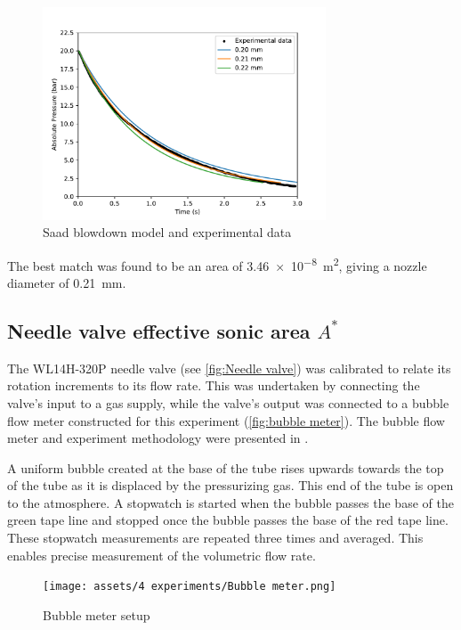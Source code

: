             \begin{figure}[!ht]
                \centering
                \includegraphics[width=0.75\textwidth]{assets/4 experiments/Saad blowdown fit.pdf}
                \caption{Saad blowdown model and experimental data}
                \label{fig:saad blowdown}
            \end{figure}

            The best match was found to be an area of \qty{3.46e-8}{m^2}, giving a nozzle diameter of \qty{0.21}{mm}.

        \subsection{Needle valve effective sonic area $A^*$}

            The WL14H-320P needle valve (see \autoref{fig:Needle valve})  was calibrated to relate its rotation increments to its flow rate. This was undertaken by connecting the valve's input to a gas supply, while the valve's output was connected to a bubble flow meter constructed for this experiment (\autoref{fig:bubble meter}). The bubble flow meter and experiment methodology were presented in \textcite{barigouFluidMechanicsSoap1993}.

            A uniform bubble created at the base of the tube rises upwards towards the top of the tube as it is displaced by the pressurizing gas. This end of the tube is open to the atmosphere. A stopwatch is started when the bubble passes the base of the green tape line and stopped once the bubble passes the base of the red tape line. These stopwatch measurements are repeated three times and averaged. This enables precise measurement of the volumetric flow rate.

            \begin{figure}[!ht]
                \centering
                \texttt{[image: assets/4 experiments/Bubble meter.png]}
                \caption{Bubble meter setup}
                \label{fig:bubble meter}
            \end{figure}

